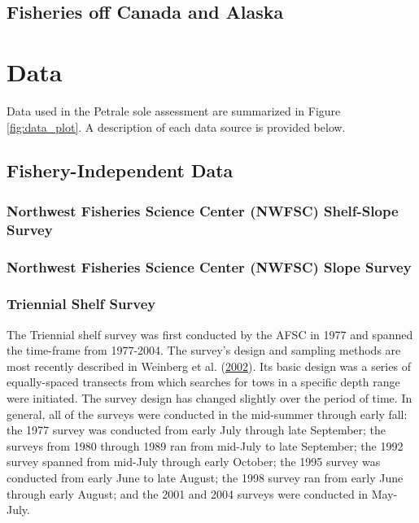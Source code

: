 \documentclass[12pt,]{article}
\begin{document}
\subsection{Fisheries off Canada and
Alaska}\label{fisheries-off-canada-and-alaska}

\section{Data}\label{data}

Data used in the Petrale sole assessment are summarized in Figure
\ref{fig:data_plot}. A description of each data source is provided
below.

\subsection{Fishery-Independent Data}\label{fishery-independent-data}

\subsubsection{Northwest Fisheries Science Center (NWFSC) Shelf-Slope
Survey}\label{northwest-fisheries-science-center-nwfsc-shelf-slope-survey}

\subsubsection{Northwest Fisheries Science Center (NWFSC) Slope
Survey}\label{northwest-fisheries-science-center-nwfsc-slope-survey}

\subsubsection{Triennial Shelf Survey}\label{triennial-shelf-survey}

The Triennial shelf survey was first conducted by the AFSC in 1977 and
spanned the time-frame from 1977-2004. The survey's design and sampling
methods are most recently described in Weinberg et al.
(\protect\hyperlink{ref-weinberg_estimation_2002}{2002}). Its basic
design was a series of equally-spaced transects from which searches for
tows in a specific depth range were initiated. The survey design has
changed slightly over the period of time. In general, all of the surveys
were conducted in the mid-summer through early fall: the 1977 survey was
conducted from early July through late September; the surveys from 1980
through 1989 ran from mid-July to late September; the 1992 survey
spanned from mid-July through early October; the 1995 survey was
conducted from early June to late August; the 1998 survey ran from early
June through early August; and the 2001 and 2004 surveys were conducted
in May-July.
\end{document}
